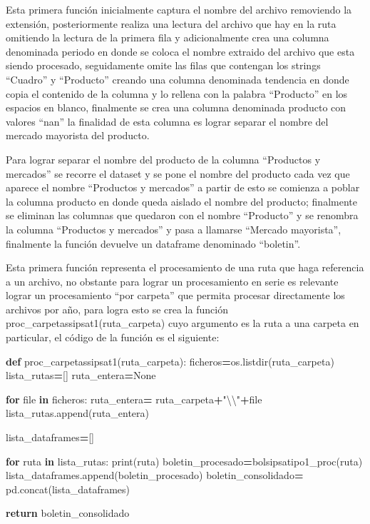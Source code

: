 \documentclass[
]{book}
\newenvironment{Shaded}{\begin{snugshade}}{\end{snugshade}}
\newcommand{\BuiltInTok}[1]{#1}
\newcommand{\CharTok}[1]{\textcolor[rgb]{0.31,0.60,0.02}{#1}}
\newcommand{\ControlFlowTok}[1]{\textcolor[rgb]{0.13,0.29,0.53}{\textbf{#1}}}
\newcommand{\KeywordTok}[1]{\textcolor[rgb]{0.13,0.29,0.53}{\textbf{#1}}}
\newcommand{\NormalTok}[1]{#1}
\newcommand{\OperatorTok}[1]{\textcolor[rgb]{0.81,0.36,0.00}{\textbf{#1}}}
\newcommand{\StringTok}[1]{\textcolor[rgb]{0.31,0.60,0.02}{#1}}
\newcommand{\VariableTok}[1]{\textcolor[rgb]{0.00,0.00,0.00}{#1}}
\begin{document}
Esta primera función inicialmente captura el nombre del archivo removiendo la extensión, posteriormente realiza una lectura del archivo que hay en la ruta omitiendo la lectura de la primera fila y adicionalmente crea una columna denominada periodo en donde se coloca el nombre extraido del archivo que esta siendo procesado, seguidamente omite las filas que contengan los strings ``Cuadro'' y ``Producto'' creando una columna denominada tendencia en donde copia el contenido de la columna y lo rellena con la palabra ``Producto'' en los espacios en blanco, finalmente se crea una columna denominada producto con valores ``nan'' la finalidad de esta columna es lograr separar el nombre del mercado mayorista del producto.

Para lograr separar el nombre del producto de la columna ``Productos y mercados'' se recorre el dataset y se pone el nombre del producto cada vez que aparece el nombre ``Productos y mercados'' a partir de esto se comienza a poblar la columna producto en donde queda aislado el nombre del producto; finalmente se eliminan las columnas que quedaron con el nombre ``Producto'' y se renombra la columna ``Productos y mercados'' y pasa a llamarse ``Mercado mayorista'', finalmente la función devuelve un dataframe denominado ``boletin''.

Esta primera función representa el procesamiento de una ruta que haga referencia a un archivo, no obstante para lograr un procesamiento en serie es relevante lograr un procesamiento ``por carpeta'' que permita procesar directamente los archivos por año, para logra esto se crea la función proc\_carpetassipsat1(ruta\_carpeta) cuyo argumento es la ruta a una carpeta en particular, el código de la función es el siguiente:

\begin{Shaded}
\begin{Highlighting}[]

\KeywordTok{def}\NormalTok{ proc\_carpetassipsat1(ruta\_carpeta):}
\NormalTok{    ficheros}\OperatorTok{=}\NormalTok{os.listdir(ruta\_carpeta)}
\NormalTok{    lista\_rutas}\OperatorTok{=}\NormalTok{[]}
\NormalTok{    ruta\_entera}\OperatorTok{=}\VariableTok{None}
    
    \ControlFlowTok{for} \BuiltInTok{file} \KeywordTok{in}\NormalTok{ ficheros:}
\NormalTok{        ruta\_entera}\OperatorTok{=}\NormalTok{ ruta\_carpeta}\OperatorTok{+}\StringTok{"}\CharTok{\textbackslash{}\textbackslash{}}\StringTok{"}\OperatorTok{+}\BuiltInTok{file}
\NormalTok{        lista\_rutas.append(ruta\_entera)}
    
\NormalTok{    lista\_dataframes}\OperatorTok{=}\NormalTok{[]}
    
    \ControlFlowTok{for}\NormalTok{ ruta }\KeywordTok{in}\NormalTok{ lista\_rutas:}
        \BuiltInTok{print}\NormalTok{(ruta)}
\NormalTok{        boletin\_procesado}\OperatorTok{=}\NormalTok{bolsipsatipo1\_proc(ruta)}
\NormalTok{        lista\_dataframes.append(boletin\_procesado)}
\NormalTok{        boletin\_consolidado}\OperatorTok{=}\NormalTok{ pd.concat(lista\_dataframes)}
        
    \ControlFlowTok{return}\NormalTok{ boletin\_consolidado}
\end{Highlighting}
\end{Shaded}
\end{document}

